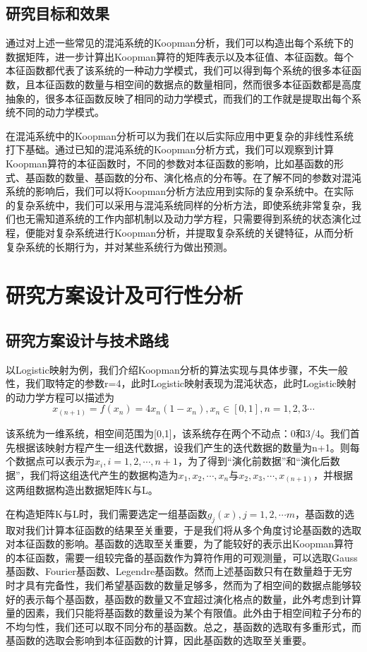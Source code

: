 \subsection{研究目标和效果}

通过对上述一些常见的混沌系统的Koopman分析，我们可以构造出每个系统下的数据矩阵，进一步计算出Koopman算符的矩阵表示以及本征值、本征函数。每个本征函数都代表了该系统的一种动力学模式，我们可以得到每个系统的很多本征函数，且本征函数的数量与相空间的数据点的数量相同，然而很多本征函数都是高度抽象的，很多本征函数反映了相同的动力学模式，而我们的工作就是提取出每个系统不同的动力学模式。

在混沌系统中的Koopman分析可以为我们在以后实际应用中更复杂的非线性系统打下基础。通过已知的混沌系统的Koopman分析方式，我们可以观察到计算Koopman算符的本征函数时，不同的参数对本征函数的影响，比如基函数的形式、基函数的数量、基函数的分布、演化格点的分布等。在了解不同的参数对混沌系统的影响后，我们可以将Koopman分析方法应用到实际的复杂系统中。在实际的复杂系统中，我们可以采用与混沌系统同样的分析方法，即使系统非常复杂，我们也无需知道系统的工作内部机制以及动力学方程，只需要得到系统的状态演化过程，便能对复杂系统进行Koopman分析，并提取复杂系统的关键特征，从而分析复杂系统的长期行为，并对某些系统行为做出预测。

\section{研究方案设计及可行性分析}
\subsection{研究方案设计与技术路线}
以Logistic映射为例，我们介绍Koopman分析的算法实现与具体步骤，不失一般性，我们取特定的参数r=4，此时Logistic映射表现为混沌状态，此时Logistic映射的动力学方程可以描述为
$$x_(n+1)=f(x_n )=4x_n (1-x_n ),x_n∈[0,1],n=1,2,3⋯$$

该系统为一维系统，相空间范围为[0,1]，该系统存在两个不动点：0和3/4。我们首先根据该映射方程产生一组迭代数据，设我们产生的迭代数据的数量为n+1。则每个数据点可以表示为$x_i,i=1,2,⋯,n+1$，为了得到“演化前数据”和“演化后数据”，我们将这组迭代产生的数据构造为${x_1,x_2,⋯,x_n }$$与$${x_2,x_3,⋯,x_(n+1) }$，并根据这两组数据构造出数据矩阵K与L。

在构造矩阵K与L时，我们需要选定一组基函数${g_j (x)},j=1,2,⋯m$，基函数的选取对我们计算本征函数的结果至关重要，于是我们将从多个角度讨论基函数的选取对本征函数的影响。基函数的选取至关重要，为了能较好的表示出Koopman算符的本征函数，需要一组较完备的基函数作为算符作用的可观测量，可以选取Gauss基函数、Fourier基函数、Legendre基函数。然而上述基函数只有在数量趋于无穷时才具有完备性，我们希望基函数的数量足够多，然而为了相空间的数据点能够较好的表示每个基函数，基函数的数量又不宜超过演化格点的数量，此外考虑到计算量的因素，我们只能将基函数的数量设为某个有限值。此外由于相空间粒子分布的不均匀性，我们还可以取不同分布的基函数。总之，基函数的选取有多重形式，而基函数的选取会影响到本征函数的计算，因此基函数的选取至关重要。

